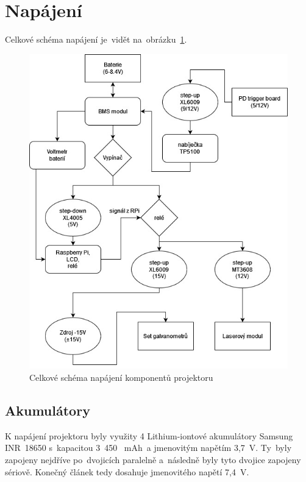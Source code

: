 \section{Napájení}
Celkové schéma napájení je~vidět na~obrázku~\ref{fig:power-schem-full}.

\begin{figure}[!h]
  \centering
  \includegraphics[width=\textwidth]{img/power-schem-full.jpg}
  \caption{\label{fig:power-schem-full} Celkové schéma napájení komponentů projektoru}
\end{figure}

\subsection{Akumulátory}
K napájení projektoru byly využity 4 Lithium-iontové akumulátory Samsung  INR~18650  s~kapacitou 3~450 ~mAh~a jmenovitým napětím 3,7~V. Ty~byly zapojeny nejdříve po~dvojicích paralelně  a~následně byly tyto dvojice zapojeny sériově. Konečný článek tedy dosahuje jmenovitého napětí 7,4~V.

